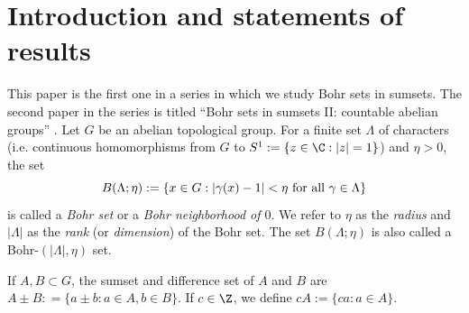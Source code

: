 \section{Introduction and statements of results}







This paper is the first one in a series in which we study Bohr sets in sumsets. The second paper in the series is titled ``Bohr sets in sumsets II: countable abelian groups'' \cite{Griesmer-Le-Le-countable}.
Let $G$ be an abelian topological group. For a finite set $\Lambda$ of characters (i.e. continuous homomorphisms from $G$ to $S^1 := \{ z \in \C: |z|=1\}$) and $\eta > 0$, the set 
\begin{equation*} \label{eq:bohr1}
B(\Lambda; \eta) := \{ x \in G : | \gamma(x)-1 | < \eta \textup{ for all } \gamma \in \Lambda\}
\end{equation*} 
is called a \textit{Bohr set} or a \emph{Bohr neighborhood of $0$}. We refer to $\eta$ as the \textit{radius} and $|\Lambda|$ as the \textit{rank} (or \textit{dimension}) of the Bohr set. The set $B(\Lambda; \eta)$ is also called a Bohr-$(|\Lambda|, \eta)$ set. 

If $A, B \subset G$, the sumset and difference set of $A$ and $B$ are $A\pm B: = \{a\pm b: a \in A, b \in B \}$. If $c \in \Z$, we define $cA:=\{ ca: a \in A\}$.
